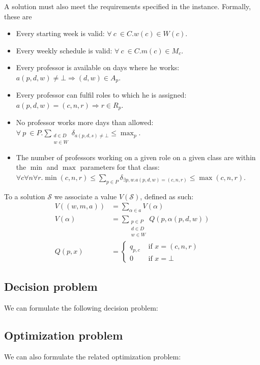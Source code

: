 A solution must also meet the requirements specified in the instance. Formally, these are

\begin{itemize}
\item Every starting week is valid: $\forall\ c\ \in C. w(c) \in W(c)$.
\item Every weekly schedule is valid: $\forall\ c\ \in C. m(c) \in M_c$.
\item Every professor is available on days where he works: $a(p, d, w) \ne \bot \Rightarrow (d, w) \in A_p$.
\item Every professor can fulfil roles to which he is assigned: $a(p, d, w) = (c, n, r) \Rightarrow r \in R_p$.
\item No professor works more days than allowed: $\forall\ p\ \in P. \sum_{\substack{d \in D\\w \in W}} \delta_{a(p, d, s) \ne \bot} \le \max_p$.
\item The number of professors working on a given role on a given class are within the $\min$ and $\max$ parameters for that class: $\forall c \forall n \forall r. \min(c, n, r) \le \sum_{p \in P} \delta_{\exists p, w. a(p, d, w) = (c, n, r)} \le \max(c, n, r)$.
\end{itemize}

To a solution $\mathcal{S}$ we associate a value $V(\mathcal{S})$, defined as such:
\begin{align*}
V((w, m, a)) &= \sum_{\alpha \in a} V(\alpha)\\
V(\alpha) &= \sum_{\substack{p \in P \\d \in D \\ w \in W}} Q(p, \alpha(p, d, w))\\
Q(p, x) &= \begin{cases}
q_{p, c} & \text{ if } x = (c, n, r)\\
0 &\text{ if } x = \bot
\end{cases}
\end{align*}

\newpage
\subsection{Decision problem}
We can formulate the following decision problem:

\subsection{Optimization problem}
We can also formulate the related optimization problem:
